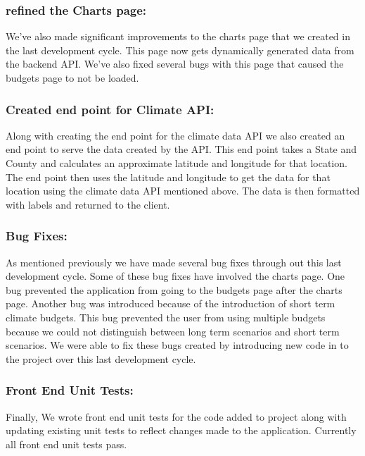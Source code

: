 \documentclass[onecolumn, draftclsnofoot,10pt, compsoc]{article}
\begin{document}
		\subsubsection{refined the Charts page:}
		We've also made significant improvements to the charts page that we created in the last development cycle. This page now gets dynamically generated data from the backend API. We've also fixed several bugs with this page that caused the budgets page to not be loaded.\\
		
		\subsubsection{Created end point for Climate API:}
		Along with creating the end point for the climate data API we also created an end point to serve the data created by the API. This end point takes a State and County and calculates an approximate latitude and longitude for that location. The end point then uses the latitude and longitude to get the data for that location using the climate data API mentioned above. The data is then formatted with labels and returned to the client.\\
		
		\subsubsection{Bug Fixes:}
		As mentioned previously we have made several bug fixes through out this last development cycle. Some of these bug fixes have involved the charts page. One bug prevented the application from going to the budgets page after the charts page. Another bug was introduced because of the introduction of short term climate budgets. This bug prevented the user from using multiple budgets because we could not distinguish between long term scenarios and short term scenarios. We were able to fix these bugs created by introducing new code in to the project over this last development cycle.\\
		
		\subsubsection{Front End Unit Tests:}
		Finally, We wrote front end unit tests for the code added to project along with updating existing unit tests to reflect changes made to the application. Currently all front end unit tests pass.\\
		
\end{document}
